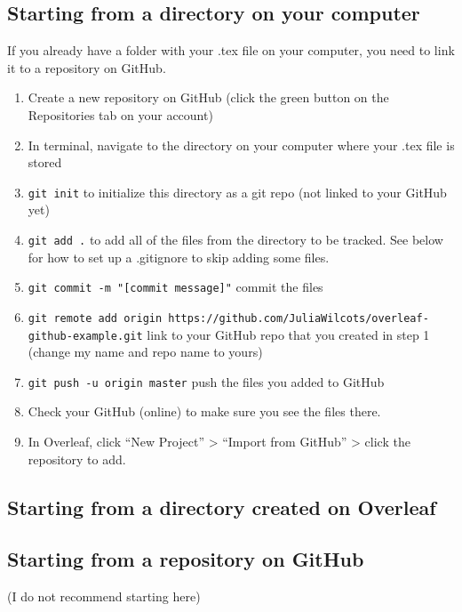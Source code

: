 \documentclass[10pt]{article}
\begin{document}
\subsection{Starting from a directory on your computer}
If you already have a folder with your .tex file on your computer, you need to link it to a repository on GitHub.
\begin{enumerate}
\item Create a new repository on GitHub (click the green button on the Repositories tab on your account)
\item In terminal, navigate to the directory on your computer where your .tex file is stored
\item \texttt{git init} to initialize this directory as a git repo (not linked to your GitHub yet)
\item \texttt{git add .} to add all of the files from the directory to be tracked. See below for how to set up a .gitignore to skip adding some files.
\item \texttt{git commit -m "[commit message]"} commit the files
\item \texttt{git remote add origin https://github.com/JuliaWilcots/overleaf-github-example.git} link to your GitHub repo that you created in step 1 (change my name and repo name to yours)
\item \texttt{git push -u origin master} push the files you added to GitHub
\item Check your GitHub (online) to make sure you see the files there.
\item In Overleaf, click ``New Project'' > ``Import from GitHub''  > click the repository to add.
\end{enumerate}

\subsection{Starting from a directory created on Overleaf}

\subsection{Starting from a repository on GitHub}
(I do not recommend starting here)
\end{document}
